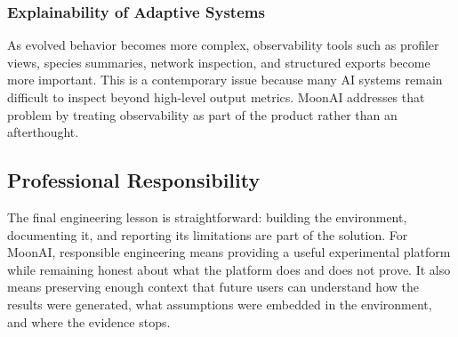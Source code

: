 \subsubsection{Explainability of Adaptive Systems}

As evolved behavior becomes more complex, observability tools such as profiler views, species
summaries, network inspection, and structured exports become more important. This is a
contemporary issue because many AI systems remain difficult to inspect beyond high-level output
metrics. MoonAI addresses that problem by treating observability as part of the product rather
than an afterthought.

\subsection{Professional Responsibility}

The final engineering lesson is straightforward: building the environment, documenting it, and
reporting its limitations are part of the solution. For MoonAI, responsible engineering means
providing a useful experimental platform while remaining honest about what the platform does and
does not prove. It also means preserving enough context that future users can understand how the
results were generated, what assumptions were embedded in the environment, and where the
evidence stops.
